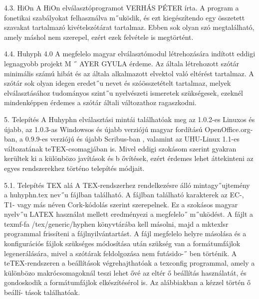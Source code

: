 \documentclass[11pt]{beamer}
\begin{document}
    \begin{frame}
        4.3. HiOn
        A HiOn elválasztóprogramot VERHÁS PÉTER írta. A program a fonetikai szabályokat felhasználva m˝uködik, és ezt kiegészítendo egy összetett szavakat tartalmazó kivételszótárat
        tartalmaz. Ebben sok olyan szó megtalálható, amely máshol nem szerepel, ezért ezek felvétele is megtörtént.
    \end{frame}

    \begin{frame}
        4.4. Huhyph 4.0
        A megfelelo magyar elválasztómodul létrehozására indított eddigi legnagyobb projekt M ˝ AYER
        GYULA érdeme. Az általa létrehozott szótár minimális számú hibát és az általa alkalmazott
        elvektol való eltérést tartalmaz. A szótár sok olyan idegen eredet˝u nevet és szóösszetételt
        tartalmaz, melyek elválasztásához tudományos szint˝u nyelvészeti ismeretek szükségesek,
        ezeknél mindenképpen érdemes a szótár általi változathoz ragaszkodni.
    \end{frame}

    \begin{frame}
        5. Telepítés
        A Huhyphn elválasztási mintái találhatóak meg az 1.0.2-es Linuxos és újabb, az 1.0.3-as
        Windowsos és újabb verziójú magyar fordítású OpenOffice.org-ban, a 0.9.9-es verziójú és
        újabb Scribus-ban , valamint az UHU-Linux 1.1-es változatának teTEX-csomagjában is.
        Mivel eddigi szokásom szerint gyakran kerültek ki a különbözo javítások és b ővítések,
        ezért érdemes lehet áttekinteni az egyes rendszerekhez történo telepítés módjait.
    \end{frame}

    \begin{frame}
        5.1. Telepítés TEX alá
        A TEX-rendszerhez rendelkezésre álló mintagy˝ujtemény a huhyphn.tex nev˝u fájlban
        található. A fájlban található karakterek az EC-, T1- vagy más néven Cork-kódolás szerint szerepelnek. Ez a szokásos magyar nyelv˝u LATEX használat mellett eredményezi a megfelelo˝
        m˝uködést. A fájlt a texmf-fa /tex/generic/hyphen könyvtárába kell másolni, majd
        a mktexlsr programmal frissíteni a fájlnyilvántartást.
        A fájl megfelelo helyre másolása és a konfigurációs fájlok szükséges módosítása után
        szükség van a formátumfájlok legenerálására, mivel a szótárak feldolgozása nem futásido-˝
        ben történik. A teTEX-rendszeren a beállítások végrehajthatóak a texconfig programmal, amely a különbözo makrócsomagoknál teszi lehet ővé az eltér ő beállítás használatát,
        és gondoskodik a formátumfájlok elkészítésérol is. Az alábbiakban a kézzel történ ő beállí-
        tások találhatóak.
    \end{frame}
\end{document}
